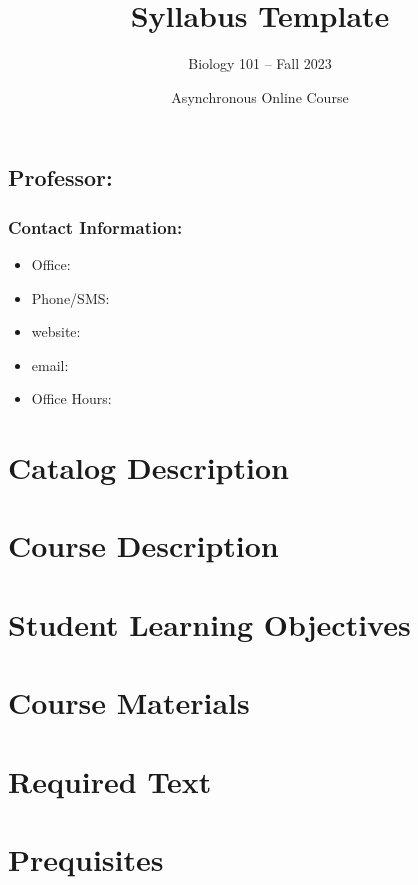\documentclass[12pt, letterpaper]{article}
\begin{document}
\title{\textbf{Syllabus Template}}

\author{Biology 101 -- Fall 2023}
\date{Asynchronous Online Course}

    \maketitle


\subsection*{Professor:}

\subsubsection*{Contact Information:}

\begin{itemize}
	\item Office: 
	\item Phone/SMS: 
	\item website: 
	\item email: 
	\item Office Hours:
\end{itemize}

\section*{Catalog Description}

\section*{Course Description}

\section*{Student Learning Objectives}

\section*{Course Materials}

\section*{Required Text}

\section*{Prequisites}
\end{document}
